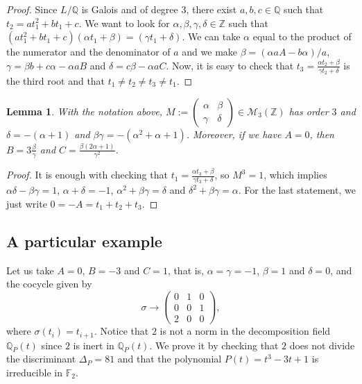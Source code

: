 \documentclass[a4paper,10pt]{amsart}
\theoremstyle{plain}
\newtheorem{lemma}[theorem]{Lemma}
\theoremstyle{definition}
\theoremstyle{remark}
\numberwithin{equation}{section}
\begin{document}
\begin{proof} Since $L/\mathbb{Q}$ is Galois and of degree $3$, there exist $a,b,c\in\mathbb{Q}$ such that $t_2=at_1^2+bt_1+c$. We want to look for $\alpha,\beta,\gamma,\delta\in\mathbb{Z}$ such that $(at_1^2+bt_1+c)(\alpha t_1+\beta)=(\gamma t_1+\delta)$. We can take $\alpha$ equal to the product of the numerator and the denominator of $a$ and we make $\beta=(\alpha a A-b\alpha)/a$, $\gamma = \beta b+ c\alpha -\alpha a B$ and $\delta = c\beta-\alpha a C$. Now, it is easy to check that $t_3=\frac{\alpha t_2+\beta}{\gamma t_2+\delta}$ is the third root and that $t_1\neq t_2\neq t_3\neq t_1$.
\end{proof}

\begin{lemma} With the notation above, $M:=\begin{pmatrix}\alpha & \beta \\ \gamma & \delta
	\end{pmatrix} \in \mathcal{M}_3(\mathbb{Z})$ has order $3$ and $\delta=-(\alpha+1)$ and $\beta\gamma=-(\alpha^2+\alpha+1)$. Moreover, if we have $A=0$, then $B=3\frac{\beta}{\gamma}$ and $C=\frac{\beta(2\alpha+1)}{\gamma^2}$.
\end{lemma}

\begin{proof} It is enough with checking that $t_1=\frac{\alpha t_3+\beta}{\gamma t_3+\delta}$, so $M^3=1$, which implies $\alpha\delta-\beta\gamma=1$, $\alpha+\delta=-1$, $\alpha^2+\beta\gamma=\delta$ and $\delta^2+\beta\gamma=\alpha$. For the last statement, we just write $0=-A=t_1+t_2+t_3$.
\end{proof}

\subsection{A particular example}\label{subsec-example}
Let us take $A=0$, $B=-3$ and $C=1$, that is, $\alpha=\gamma=-1$, $\beta=1$ and $\delta=0$, and the cocycle given by
\small{
$$
\sigma\rightarrow\begin{pmatrix}
0 & 1 & 0\\
0 & 0 & 1\\
2 & 0 & 0
\end{pmatrix},
$$}
where $\sigma(t_i)=t_{i+1}$. Notice that $2$ is not a norm in the decomposition field $\mathbb{Q}_P(t)$ since $2$ is inert in $\mathbb{Q}_P(t)$. We prove it by checking that $2$ does not divide the discriminant $\Delta_P=81$ and that the polynomial $P(t)=t^3-3t+1$ is irreducible in $\mathbb{F}_2$. 
\end{document}
